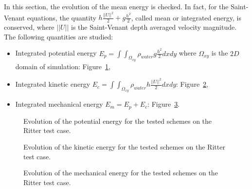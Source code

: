 In this section, the evolution of the mean energy is checked.
In fact, for the Saint-Venant equations, the quantity
$h \frac{||U||^2}{2} + g \frac{h^2}{2}$, called mean or integrated energy, is
conserved, where $||U||$ is the Saint-Venant depth averaged velocity magnitude.
The following quantities are studied:
\begin{itemize}
\item Integrated potential energy
  \textbf{$E_p =\int\int_{\Omega_{xy}}\rho_{water} g \frac{h^2}{2} dxdy$} where
  $\Omega_{xy}$ is the $2D$ domain of simulation: Figure~\ref{fig:ritter:Ep},
\item Integrated kinetic energy
  \textbf{$E_c =\int\int_{\Omega_{xy}} \rho_{water} h \frac{||U||^2}{2} dxdy$}:
  Figure~\ref{fig:ritter:Ec},
\item Integrated mechanical energy \textbf{$E_m = E_p + E_c$}:
  Figure~\ref{fig:ritter:Em}.
\end{itemize}

\begin{figure}[H]
\centering
  \caption{Evolution of the potential energy for the tested schemes on the Ritter test case.}
\label{fig:ritter:Ep}
\end{figure}

\begin{figure}[H]
\centering
  \caption{Evolution of the kinetic energy for the tested schemes on the Ritter test case.}
\label{fig:ritter:Ec}
\end{figure}

\begin{figure}[H]
\centering
  \caption{Evolution of the mechanical energy for the tested schemes on the Ritter test case.}
\label{fig:ritter:Em}
\end{figure}

\newpage

